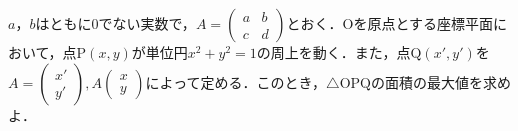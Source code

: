 \documentclass[../../main.tex]{subfiles}
\begin{document}
$a$，$b$はともに$0$でない実数で，$A=
\begin{pmatrix} a&b\\c&d
\end{pmatrix}$とおく．$\mathrm{O}$を原点とする座標平面において，点$\mathrm{P}(x,y)$が単位円$x^2+y^2=1$の周上を動く．また，点$\mathrm{Q}(x',y')$を$A=
\begin{pmatrix} x'\\y'
\end{pmatrix}, A
\begin{pmatrix} x\\y
\end{pmatrix}$によって定める．このとき，$\triangle \mathrm{OPQ}$の面積の最大値を求めよ．
\end{document}

